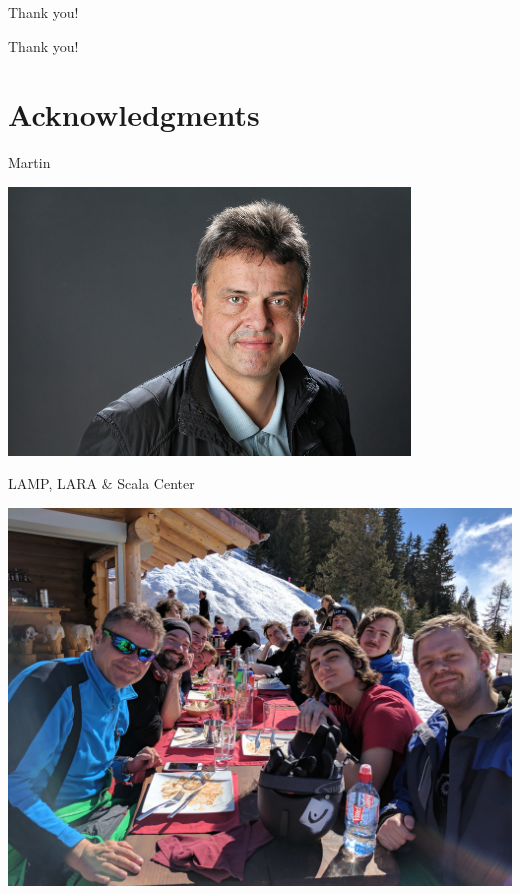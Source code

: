 \documentclass[10pt]{beamer}
\newenvironment{slide}[2][]
  {\begin{frame}[fragile,environment=slide,#1]{#2}}
  {\end{frame}}
\begin{document}
\begin{slide}{Thank you!}
\begin{center}
\Huge Thank you!
\end{center}
\end{slide}

\section{Acknowledgments}

\begin{slide}{Martin}
\begin{center}
\includegraphics[width=0.8\textwidth]{figures/martin.jpg}
\end{center}
\end{slide}

\begin{slide}{LAMP, LARA \& Scala Center}
\begin{center}
\includegraphics[width=\textwidth]{figures/ski-trip.jpg}
\end{center}
\end{slide}
\end{document}
